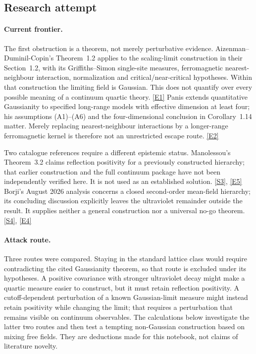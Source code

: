 \documentclass[11pt]{article}
\newcommand{\sref}[2]{\hyperlink{source:#1:#2}{[S#2]}}
\newcommand{\eref}[2]{\hyperlink{extra:#1:#2}{[E#2]}}
\begin{document}
\subsection{Research attempt}

\paragraph{Current frontier.}
The first obstruction is a theorem, not merely perturbative evidence.
Aizenman--Duminil-Copin's Theorem~1.2 applies to the scaling-limit
construction in their Section~1.2, with its Griffiths--Simon single-site
measures, ferromagnetic nearest-neighbour interaction, normalization and
critical/near-critical hypotheses. Within that construction the limiting
field is Gaussian. This does not quantify over every possible meaning of a
continuum quartic theory. \eref{30006697}{1}
Panis extends quantitative Gaussianity to specified long-range models with
effective dimension at least four; his assumptions (A1)--(A6) and the
four-dimensional conclusion in Corollary~1.14 matter. Merely replacing
nearest-neighbour interactions by a longer-range ferromagnetic kernel is
therefore not an unrestricted escape route. \eref{30006697}{2}

Two catalogue references require a different epistemic status. Manolessou's
Theorem~3.2 claims reflection positivity for a previously constructed
hierarchy; that earlier construction and the full continuum package have
not been independently verified here. It is not used as an established
solution. \sref{30006697}{3}, \eref{30006697}{5}
Borji's August 2026 analysis concerns a closed second-order mean-field
hierarchy; its concluding discussion explicitly leaves the ultraviolet
remainder outside the result. It supplies neither a general construction
nor a universal no-go theorem. \sref{30006697}{4}, \eref{30006697}{4}

\paragraph{Attack route.}
Three routes were compared. Staying in the standard lattice class would
require contradicting the cited Gaussianity theorem, so that route is
excluded under its hypotheses. A positive covariance with stronger
ultraviolet decay might make a quartic measure easier to construct, but it
must retain reflection positivity. A cutoff-dependent perturbation of a
known Gaussian-limit measure might instead retain positivity while changing
the limit; that requires a perturbation that remains visible on continuum
observables. The calculations below investigate the latter two routes and
then test a tempting non-Gaussian construction based on mixing free fields.
They are deductions made for this notebook, not claims of literature novelty.
\end{document}
